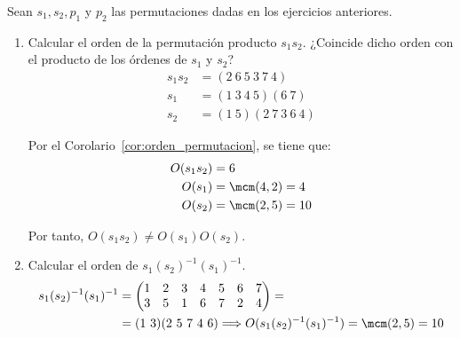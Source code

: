 \begin{ejercicio}\label{ej:2.17}
    Sean $s_1, s_2, p_1$ y $p_2$ las permutaciones dadas en los ejercicios anteriores.
    \begin{enumerate}
        \item Calcular el orden de la permutación producto $s_1s_2$. ¿Coincide dicho orden con el producto de los órdenes de $s_1$ y $s_2$?
        \begin{align*}
            s_1s_2 &= (2\ 6\ 5\ 3\ 7\ 4)\\
            s_1 &= (1\ 3\ 4\ 5)(6\ 7)\\
            s_2 &= (1\ 5)(2\ 7\ 3\ 6\ 4)
        \end{align*}

        Por el Corolario~\ref{cor:orden_permutacion}, se tiene que:
        \begin{align*}
            O(s_1s_2) &= 6\\
            O(s_1) &= \mcm(4, 2) = 4\\
            O(s_2) &= \mcm(2, 5) = 10
        \end{align*}

        Por tanto, $O(s_1s_2) \neq O(s_1)O(s_2)$.
        
        \item Calcular el orden de $s_1(s_2)^{-1}(s_1)^{-1}$.
        \begin{align*}
            s_1(s_2)^{-1}(s_1)^{-1}
            &=\begin{pmatrix}
                1 & 2 & 3 & 4 & 5 & 6 & 7 \\
                3 & 5 & 1 & 6 & 7 & 2 & 4
            \end{pmatrix}
            =\\&= (1\ 3)(2\ 5\ 7\ 4\ 6)
            \Longrightarrow
            O(s_1(s_2)^{-1}(s_1)^{-1}) = \mcm(2, 5) = 10
        \end{align*}


\end{enumerate}
\end{ejercicio}
